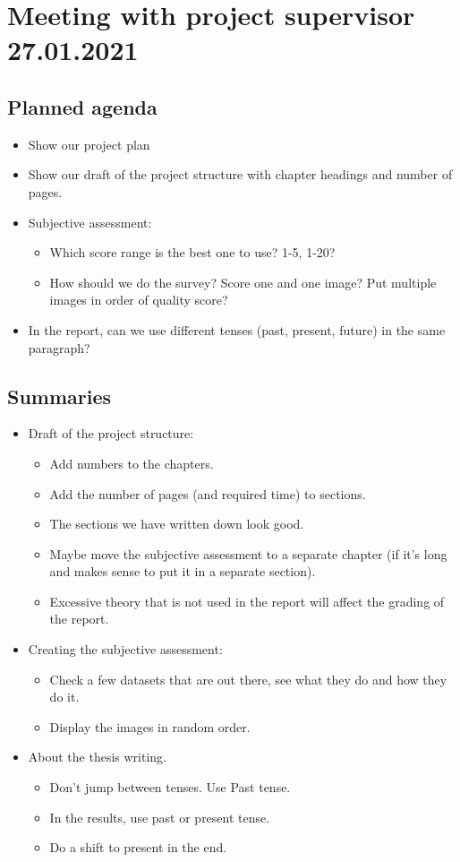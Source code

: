 \section*{Meeting with project supervisor 27.01.2021}
\subsection*{Planned agenda}
\begin{itemize}
\item Show our project plan
\item Show our draft of the project structure with chapter headings and number of pages.
\item Subjective assessment: 
    \begin{itemize}
    \item Which score range is the best one to use? 1-5, 1-20?
    \item How should we do the survey? Score one and one image? Put multiple images in order of quality score?
    \end{itemize}
\item In the report, can we use different tenses (past, present, future) in the same paragraph?
\end{itemize}

\subsection*{Summaries}
\begin{itemize}
    \item Draft of the project structure:
    \begin{itemize}
        \item Add numbers to the chapters.
        \item Add the number of pages (and required time) to sections.
        \item The sections we have written down look good.
        \item Maybe move the subjective assessment to a separate chapter (if it’s long and makes sense to put it in a separate section). 
        \item Excessive theory that is not used in the report will affect the grading of the report.
    \end{itemize}
    \item Creating the subjective assessment:
    \begin{itemize}
        \item Check a few datasets that are out there, see what they do and how they do it.
        \item Display the images in random order.
    \end{itemize}
    \item About the thesis writing.
    \begin{itemize}
        \item Don’t jump between tenses. Use Past tense.
        \item In the results, use past or present tense.
        \item Do a shift to present in the end.
        \end{itemize}
\end{itemize}

